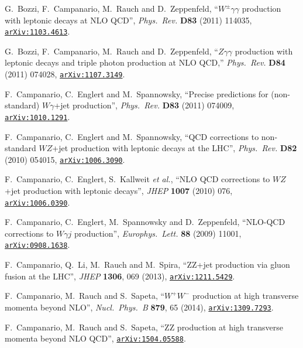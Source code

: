 \documentclass[english,12pt]{article}
\begin{document}
\begin{thebibliography}{10}
  G.~Bozzi, F.~Campanario, M.~Rauch and D.~Zeppenfeld,
  ``$W^{\pm}\gamma \gamma$ production with leptonic decays at NLO QCD'',
  {\em Phys.\ Rev.}  {\bf D83} (2011) 114035,
  \href{http://arxiv.org/abs/1103.4613}{{\tt arXiv:1103.4613}}.

  G.~Bozzi, F.~Campanario, M.~Rauch and D.~Zeppenfeld,
  ``$Z\gamma\gamma$ production with leptonic decays and triple photon production at NLO QCD,''
  {\em Phys.\ Rev.} {\bf D84} (2011) 074028,
  \href{http://arxiv.org/abs/1107.3149}{{\tt arXiv:1107.3149}}.
  
  F.~Campanario, C.~Englert and M.~Spannowsky,
  ``Precise predictions for (non-standard) $W \gamma$+jet production'',
  {\em Phys.\ Rev.}  {\bf D83} (2011) 074009,
  \href{http://arxiv.org/abs/1010.1291}{{\tt arXiv:1010.1291}}.
 
  F.~Campanario, C.~Englert and M.~Spannowsky,
  ``QCD corrections to non-standard $WZ$+jet production with leptonic decays at
  the LHC'',
  {\em Phys.\ Rev.} {\bf D82} (2010) 054015,
\href{http://www.arXiv.org/abs/1006.3090}{{\tt arXiv:1006.3090}}.
  
  F.~Campanario, C.~Englert, S.~Kallweit {\it et al.},
  ``{NLO QCD corrections to $WZ$+jet production with leptonic decays}'',
  {\em JHEP} {\bf 1007} (2010) 076,
\href{http://www.arXiv.org/abs/1006.0390}{{\tt arXiv:1006.0390}}.
   
  F.~Campanario, C.~Englert, M.~Spannowsky and D.~Zeppenfeld,
  ``NLO-QCD corrections to $W\gamma j$ production'',
  {\em Europhys.\ Lett.}  {\bf 88} (2009) 11001,
\href{http://www.arXiv.org/abs/0908.1638}{{\tt arXiv:0908.1638}}.

  F.~Campanario, Q.~Li, M.~Rauch and M.~Spira,
  ``ZZ+jet production via gluon fusion at the LHC'',
  {\em JHEP} {\bf 1306}, 069 (2013),
\href{http://www.arXiv.org/abs/1211.5429}{{\tt arXiv:1211.5429}}.

  F.~Campanario, M.~Rauch and S.~Sapeta,
  ``$W^+W^-$ production at high transverse momenta beyond NLO'',
  {\em Nucl.\ Phys.\ B} {\bf 879}, 65 (2014),
\href{http://www.arXiv.org/abs/1309.7293}{{\tt arXiv:1309.7293}}.

  F.~Campanario, M.~Rauch and S.~Sapeta,
  ``ZZ production at high transverse momenta beyond NLO QCD'',
\href{http://www.arXiv.org/abs/1504.05588}{{\tt arXiv:1504.05588}}.


\end{thebibliography}
\end{document}
